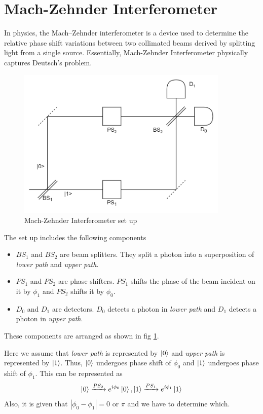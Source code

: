 \documentclass[11.5pt, paper=a4]{article}
\theoremstyle{definition}
\numberwithin{theorem}{section}
\begin{document}
\section{Mach-Zehnder Interferometer}
In physics, the Mach–Zehnder interferometer is a device used to determine the relative phase shift variations between two collimated beams derived by splitting light from a single source.\cite{Wikipedia} Essentially, Mach-Zehnder Interferometer physically captures Deutsch's problem.
\begin{figure}[H]
\centering
\includegraphics[width=0.9\textwidth]{images/Mach-Zehnder Interferometer.png}
\caption{Mach-Zehnder Interferometer set up}
\label{fig:1}
\end{figure}
The set up includes the following components
\begin{itemize}
\item $BS_1$ and $BS_2$ are beam splitters. They split a photon into a superposition of \emph{lower path} and \emph{upper path}.
\item $PS_1$ and $PS_2$ are phase shifters. $PS_1$ shifts the phase of the beam incident on it by $\phi_1$ and $PS_2$ shifts it by $\phi_0$.
\item $D_0$ and $D_1$ are detectors. $D_0$ detects a photon in \emph{lower path} and $D_1$ detects a photon in \emph{upper path}.
\end{itemize}

These components are arranged as shown in fig \ref{fig:1}.

Here we assume that \emph{lower path} is represented by $\ket0$ and \emph{upper path} is represented by $\ket1$. Thus, $\ket0$ undergoes phase shift of $\phi_0$ and $\ket1$ undergoes phase shift of $\phi_1$. This can be represented as
\begin{equation*}
\ket0\xrightarrow{PS_2}e^{i\phi_0}\ket0,\ket1\xrightarrow{PS_1}e^{i\phi_1}\ket1
\end{equation*}
Also, it is given that $\left|\phi_0-\phi_1\right|=0$ or $\pi$ and we have to determine which.
\end{document}
